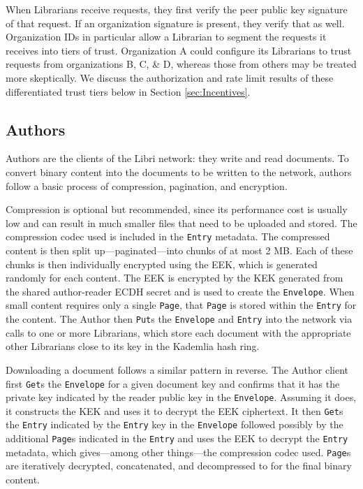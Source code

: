 \documentclass[10pt]{article}
\newcommand{\ttt}[1]{\texttt{#1}}
\def\Entry{\ttt{Entry}}
\def\Page{\ttt{Page}}
\def\Envelope{\ttt{Envelope}}
\begin{document}
When Librarians receive requests, they first verify the peer public key signature of that request. If an organization signature is present, they verify that as well. Organization IDs in particular allow a Librarian to segment the requests it receives into tiers of trust. Organization A could configure its Librarians to trust requests from organizations B, C, \& D, whereas those from others may be treated more skeptically. We discuss the authorization and rate limit results of these differentiated trust tiers below in Section \ref{sec:Incentives}.

\subsection{Authors}
\label{sec:Authors}

Authors are the clients of the Libri network: they write and read documents. To convert binary content into the documents to be written to the network, authors follow a basic process of compression, pagination, and encryption. 

Compression is optional but recommended, since its performance cost is usually low and can result in much smaller files that need to be uploaded and stored. The compression codec used is included in the \Entry{} metadata. The compressed content is then split up---paginated---into chunks of at most 2 MB. Each of these chunks is then individually encrypted using the EEK, which is generated randomly for each content. The EEK is encrypted by the KEK generated from the shared author-reader ECDH secret and is used to create the \Envelope{}. When small content requires only a single \Page{}, that \Page{} is stored within the \Entry{} for the content. The Author then \ttt{Put}s the \Envelope{} and \Entry{} into the network via calls to one or more Librarians, which store each document with the appropriate other Librarians close to its key in the Kademlia hash ring. 

Downloading a document follows a similar pattern in reverse. The Author client first \ttt{Get}s the \Envelope{} for a given document key and confirms that it has the private key indicated by the reader public key in the \Envelope{}. Assuming it does, it constructs the KEK and uses it to decrypt the EEK ciphertext. It then \texttt{Get}s the \Entry{} indicated by the \Entry{} key in the \Envelope{} followed possibly by the additional \Page{}s indicated in the \Entry{} and uses the EEK to decrypt the \Entry{} metadata, which gives---among other things---the compression codec used. \Page{}s are iteratively decrypted, concatenated, and decompressed to for the final binary content. 
\end{document}
